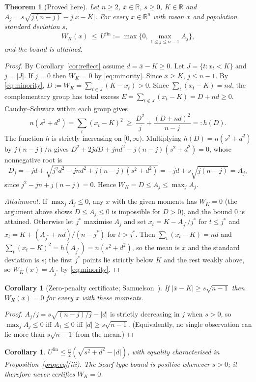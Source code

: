 \documentclass[11pt,a4paper]{article}
\newtheorem{theorem}{Theorem}
\newtheorem{corollary}{Corollary}
\theoremstyle{definition}
\theoremstyle{plain}\newtheorem{sprop}{Proposition}[section]\newtheorem{slemma}[sprop]{Lemma}\newtheorem{scor}[sprop]{Corollary}
\theoremstyle{definition}
\theoremstyle{remark}
\newcommand{\xbar}{\bar{x}}
\numberwithin{equation}{section}
\begin{document}
\begin{theorem}[Proved here]\label{thm:finite}
Let $n\ge2$, $\xbar\in\mathbb R$, $s\ge0$, $K\in\mathbb R$ and $A_j=s\sqrt{j(n-j)}-j|\xbar-K|$. For every $x\in\mathbb R^n$ with mean $\xbar$ and population standard deviation $s$,
\[
W_K(x)\ \le\ U^{\mathrm{fin}}:=\max\Big\{0,\max_{1\le j\le n-1}A_j\Big\},
\]
and the bound is attained.
\end{theorem}
\begin{proof}
By Corollary~\ref{cor:reflect} assume $d=\xbar-K\ge0$. Let $J=\{t:x_t<K\}$ and $j=|J|$. If $j=0$ then $W_K=0$ by \eqref{eq:minority}. Since $\xbar\ge K$, $j\le n-1$. By \eqref{eq:minority}, $D:=W_K=\sum_{t\in J}(K-x_t)>0$. Since $\sum_t(x_t-K)=nd$, the complementary group has total excess $E=\sum_{t\notin J}(x_t-K)=D+nd\ge0$. Cauchy--Schwarz within each group gives
\[
n(s^2+d^2)=\sum_t(x_t-K)^2\ \ge\ \frac{D^2}{j}+\frac{(D+nd)^2}{n-j}=:h(D).
\]
The function $h$ is strictly increasing on $[0,\infty)$. Multiplying $h(D)=n(s^2+d^2)$ by $j(n-j)/n$ gives $D^2+2jdD+jnd^2-j(n-j)(s^2+d^2)=0$, whose nonnegative root is
\[
D_j=-jd+\sqrt{j^2d^2-jnd^2+j(n-j)(s^2+d^2)}=-jd+s\sqrt{j(n-j)}=A_j ,
\]
since $j^2-jn+j(n-j)=0$. Hence $W_K=D\le A_j\le\max_jA_j$.

\emph{Attainment.} If $\max_jA_j\le0$, any $x$ with the given moments has $W_K=0$ (the argument above shows $D\le A_j\le0$ is impossible for $D>0$), and the bound $0$ is attained. Otherwise let $j^\ast$ maximise $A_j$ and set $x_t=K-A_{j^\ast}/j^\ast$ for $t\le j^\ast$ and $x_t=K+(A_{j^\ast}+nd)/(n-j^\ast)$ for $t>j^\ast$. Then $\sum_t(x_t-K)=nd$ and $\sum_t(x_t-K)^2=h(A_{j^\ast})=n(s^2+d^2)$, so the mean is $\xbar$ and the standard deviation is $s$; the first $j^\ast$ points lie strictly below $K$ and the rest weakly above, so $W_K(x)=A_{j^\ast}$ by \eqref{eq:minority}.
\end{proof}

\setcounter{corollary}{0}\begin{corollary}[Zero-penalty certificate; Samuelson~\cite{samuelson}]\label{cor:zero}
If $|\xbar-K|\ge s\sqrt{n-1}$ then $W_K(x)=0$ for every $x$ with these moments.
\end{corollary}
\begin{proof}
$A_j/j=s\sqrt{(n-j)/j}-|d|$ is strictly decreasing in $j$ when $s>0$, so $\max_jA_j\le0$ iff $A_1\le0$ iff $|d|\ge s\sqrt{n-1}$. (Equivalently, no single observation can lie more than $s\sqrt{n-1}$ from the mean.)
\end{proof}

\begin{scor}
$U^{\mathrm{fin}}\le\frac n2(\sqrt{s^2+d^2}-|d|)$, with equality characterised in Proposition~\ref{prop:eq}(iii). The Scarf-type bound is positive whenever $s>0$; it therefore never certifies $W_K=0$.
\end{scor}
\end{document}
